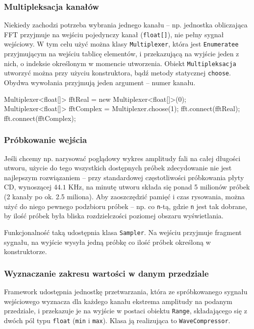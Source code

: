 \subsubsection{Multipleksacja kanałów}

Niekiedy zachodzi potrzeba wybrania jednego kanału -- np. jednostka obliczająca FFT przyjmuje na
wejściu pojedynczy kanał (\texttt{float[]}), nie pełny sygnał wejściowy. W tym celu użyć można klasy
\texttt{Multiplexer}, która jest \texttt{Enumeratee} przyjmującym na wejściu tablicę elementów, i
przekazującą na wyjście jeden z nich, o indeksie określonym w momencie utworzenia. Obiekt
\texttt{Multipleksacja} utworzyć można przy użyciu konstruktora, bądź metody statycznej
\texttt{choose}. Obydwa wywołania przyjmują jeden argument -- numer kanału.

\begin{java}
Multiplexer<float[]> fftReal = new Multiplexer<float[]>(0);
Multiplexer<float[]> fftComplex = Multiplexer.choose(1);
fft.connect(fftReal);
fft.connect(fftComplex);
\end{java}

\subsubsection{Próbkowanie wejścia}

Jeśli chcemy np. narysować poglądowy wykres amplitudy fali na całej długości utworu, użycie do tego
wszystkich dostępnych próbek zdecydowanie nie jest najlepszym rozwiązaniem -- przy standardowej
częstotliwości próbkowania płyty CD, wynoszącej $44.1$ KHz, na minutę utworu składa się ponad 5
milionów próbek (2 kanały po ok. 2.5 miliona). Aby zaoszczędzić pamięć i czas rysowania, można użyć
do niego pewnego podzbioru próbek -- np. co \texttt{n}-tą, gdzie \texttt{n} jest tak dobrane, by
ilość próbek była bliska rozdzielczości poziomej obszaru wyświetlania.

Funkcjonalność taką udostępnia klasa \texttt{Sampler}. Na wejściu przyjmuje fragment sygnału, na
wyjście wysyła jedną próbkę co ilość próbek określoną w konstruktorze.

\subsubsection{Wyznaczanie zakresu wartości w danym przedziale}

Framework udostępnia jednostkę przetwarzania, która ze spróbkowanego sygnału wejściowego wyznacza
dla każdego kanału ekstrema amplitudy na podanym przedziale, i przekazuje je na wyjście w postaci
obiektu \texttt{Range}, składającego się z dwóch pól typu \texttt{float} (\texttt{min} i
\texttt{max}). Klasa ją realizująca to \texttt{WaveCompressor}.


